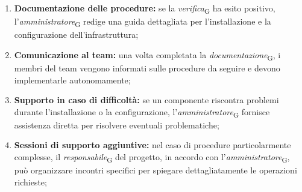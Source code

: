 \begin{enumerate}
\begin{itemize}
    \end{itemize}
    \item \textbf{Documentazione delle procedure:} se la \textit{verifica}\textsubscript{G} ha esito positivo, l’\textit{amministratore}\textsubscript{G} redige una guida dettagliata per l'installazione e la configurazione dell’infrastruttura;
    \item \textbf{Comunicazione al team:} una volta completata la \textit{documentazione}\textsubscript{G}, i membri del team vengono informati sulle procedure da seguire e devono implementarle autonomamente;
    \item \textbf{Supporto in caso di difficoltà:} se un componente riscontra problemi durante l'installazione o la configurazione, l’\textit{amministratore}\textsubscript{G} fornisce assistenza diretta per risolvere eventuali problematiche;
    \item \textbf{Sessioni di supporto aggiuntive:} nel caso di procedure particolarmente complesse, il \textit{responsabile}\textsubscript{G} del progetto, in accordo con l’\textit{amministratore}\textsubscript{G}, può organizzare incontri specifici per spiegare dettagliatamente le operazioni richieste;
\end{enumerate}

